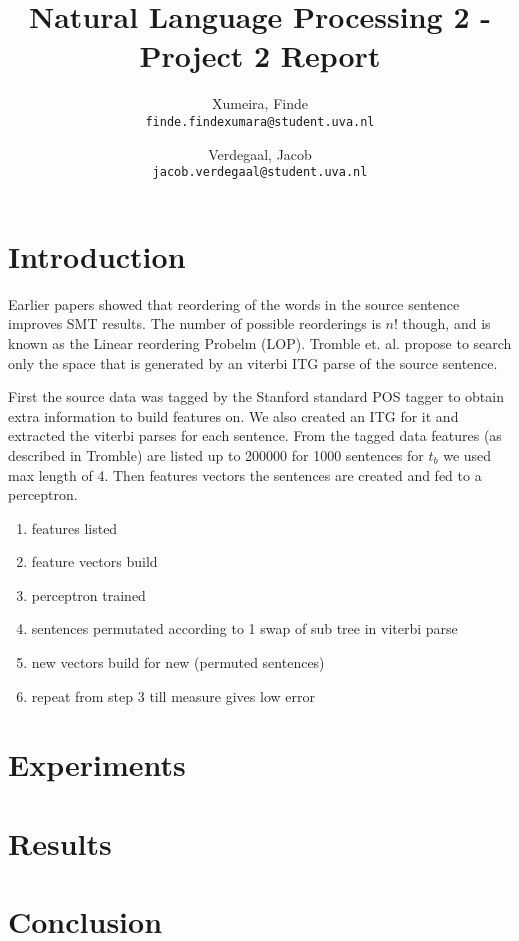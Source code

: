 \documentclass[11pt,twocolumn,DIV=11]{scrartcl}
\title{\small Natural Language Processing 2 - Project 2 Report \LARGE \\ \sc{\bf{Source Sentence Reordering for Better Translation}} }
\author{
    Xumeira, Finde\\
    \texttt{finde.findexumara@student.uva.nl}
    \and
    Verdegaal, Jacob\\
    \texttt{jacob.verdegaal@student.uva.nl}
}
\begin{document}
\maketitle


\section{Introduction}
Earlier papers showed that reordering of the words in the source sentence improves SMT results. The number of possible reorderings is $n!$ though, and is known as the Linear reordering Probelm (LOP). Tromble et. al. propose to search only the space that is generated by an viterbi ITG parse of the source sentence.

First the source data was tagged by the Stanford standard POS tagger to obtain extra information to build features on.
We also created an ITG for it and extracted the viterbi parses for each sentence.
From the tagged data features (as described in Tromble) are listed up to 200000 for 1000 sentences for $t_b$ we used max length of 4.
Then features vectors the sentences are created and fed to a perceptron.

\begin{enumerate}
  \item features listed
  \item feature vectors build
  \item perceptron trained
  \item sentences permutated according to 1 swap of sub tree in viterbi parse
  \item new vectors build for new (permuted sentences)
  \item repeat from step 3 till measure gives low error
\end {enumerate}



\section{Experiments}
\label{experiments}

\section{Results}
\label{results}

\section{Conclusion}
\label{conclusion}



\end{document}

